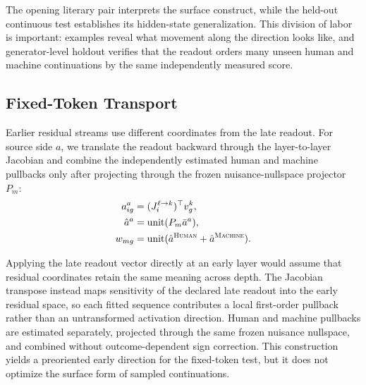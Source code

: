 The opening literary pair interprets the surface construct, while the held-out continuous test establishes its hidden-state generalization. This division of labor is important: examples reveal what movement along the direction looks like, and generator-level holdout verifies that the readout orders many unseen human and machine continuations by the same independently measured score.

\subsection{Fixed-Token Transport}

Earlier residual streams use different coordinates from the late readout. For source side \(a\), we translate the readout backward through the layer-to-layer Jacobian and combine the independently estimated human and machine pullbacks only after projecting through the frozen nuisance-nullspace projector \(P_m\):
\begin{equation}
\begin{aligned}
a_{ig}^{a}&=(J_i^{\ell\rightarrow k})^\top v_g^k,\\
\hat a^a&=\operatorname{unit}(P_m\bar a^a),\\
w_{mg}&=\operatorname{unit}(\hat a^{\textsc{Human}}+\hat a^{\textsc{Machine}}).
\end{aligned}
\label{eq:pullback-main}
\end{equation}

Applying the late readout vector directly at an early layer would assume that residual coordinates retain the same meaning across depth. The Jacobian transpose instead maps sensitivity of the declared late readout into the early residual space, so each fitted sequence contributes a local first-order pullback rather than an untransformed activation direction. Human and machine pullbacks are estimated separately, projected through the same frozen nuisance nullspace, and combined without outcome-dependent sign correction. This construction yields a preoriented early direction for the fixed-token test, but it does not optimize the surface form of sampled continuations.

